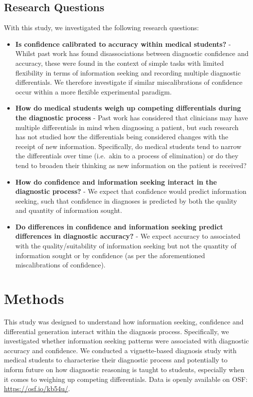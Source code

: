 \documentclass[a4paper, nobind]{templates/ociamthesis}
\providecommand{\tightlist}{%
  \setlength{\itemsep}{0pt}\setlength{\parskip}{0pt}}
\begin{document}
\subsection*{Research Questions}\label{research-questions}

With this study, we investigated the following research questions:

\begin{itemize}
\tightlist
\item
  \textbf{Is confidence calibrated to accuracy within medical students?} - Whilst past work has found disassociations between diagnostic confidence and accuracy, these were found in the context of simple tasks with limited flexibility in terms of information seeking and recording multiple diagnostic differentials. We therefore investigate if similar miscalibrations of confidence occur within a more flexible experimental paradigm.
\item
  \textbf{How do medical students weigh up competing differentials during the diagnostic process} - Past work has considered that clinicians may have multiple differentials in mind when diagnosing a patient, but such research has not studied how the differentials being considered changes with the receipt of new information. Specifically, do medical students tend to narrow the differentials over time (i.e.~akin to a process of elimination) or do they tend to broaden their thinking as new information on the patient is received?
\item
  \textbf{How do confidence and information seeking interact in the diagnostic process?} - We expect that confidence would predict information seeking, such that confidence in diagnoses is predicted by both the quality and quantity of information sought.
\item
  \textbf{Do differences in confidence and information seeking predict differences in diagnostic accuracy?} - We expect accuracy to associated with the quality/suitability of information seeking but not the quantity of information sought or by confidence (as per the aforementioned miscalibrations of confidence).
\end{itemize}

\section*{Methods}\label{methods-1}

This study was designed to understand how information seeking, confidence and differential generation interact within the diagnosis process. Specifically, we investigated whether information seeking patterns were associated with diagnostic accuracy and confidence. We conducted a vignette-based diagnosis study with medical students to characterise their diagnostic process and potentially to inform future on how diagnostic reasoning is taught to students, especially when it comes to weighing up competing differentials. Data is openly available on OSF: \url{https://osf.io/kb54u/}.
\end{document}
